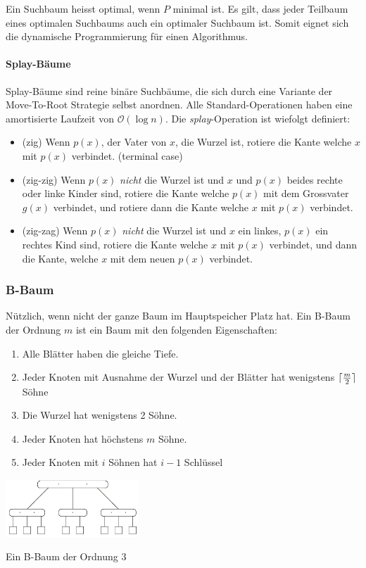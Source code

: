 \documentclass[a4paper, 9pt, DIV=20]{scrartcl}
\DeclarePairedDelimiter{\ceil}{\lceil}{\rceil}
\newcommand{\Oh}{\mathcal{O}}
\begin{document}
Ein Suchbaum heisst optimal, wenn $P$ minimal ist. Es gilt, dass jeder Teilbaum eines optimalen Suchbaums auch ein optimaler Suchbaum ist. Somit eignet sich die dynamische Programmierung für einen Algorithmus.


\paragraph{Splay-Bäume}
Splay-Bäume sind reine binäre Suchbäume, die sich durch eine Variante der Move-To-Root Strategie selbst anordnen. Alle Standard-Operationen haben eine amortisierte Laufzeit von $\Oh(\log{n})$. Die \emph{splay}-Operation ist wiefolgt definiert:
\begin{itemize}
\item (zig) Wenn $p(x)$, der Vater von $x$, die Wurzel ist, rotiere die Kante welche $x$ mit $p(x)$ verbindet. (terminal case)
\item (zig-zig) Wenn $p(x)$ \emph{nicht} die Wurzel ist und $x$ und $p(x)$ beides rechte oder linke Kinder sind, rotiere die Kante welche $p(x)$ mit dem Grossvater $g(x)$ verbindet, und rotiere dann die Kante welche $x$ mit $p(x)$ verbindet. 
\item (zig-zag) Wenn $p(x)$ \emph{nicht} die Wurzel ist und $x$ ein linkes, $p(x)$ ein rechtes Kind sind, rotiere die Kante welche $x$ mit $p(x)$ verbindet, und dann die Kante, welche $x$ mit dem neuen $p(x)$ verbindet.
\end{itemize}


\subsubsection{B-Baum}
Nützlich, wenn nicht der ganze Baum im Hauptspeicher Platz hat. Ein B-Baum der Ordnung $m$ ist ein Baum mit den folgenden Eigenschaften:
\begin{enumerate}
\item Alle Blätter haben die gleiche Tiefe.
\item Jeder Knoten mit Ausnahme der Wurzel und der Blätter hat wenigstens $\ceil{\frac{m}{2}}$ Söhne
\item Die Wurzel hat wenigstens 2 Söhne.
\item Jeder Knoten hat höchstens $m$ Söhne.
\item Jeder Knoten mit $i$ Söhnen hat $i-1$ Schlüssel
\end{enumerate}

\begin{center}
\includegraphics[width=5cm]{B-Baum}

Ein B-Baum der Ordnung 3
\end{center}
\end{document}
